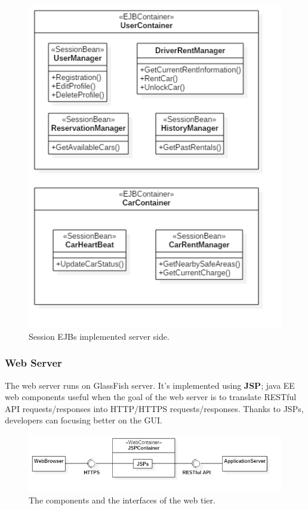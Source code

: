 \begin{figure}[H]
	\centering
	\includegraphics[width=\textwidth, keepaspectratio]{diagrams/SEJBs.png}
	\caption{Session EJBs implemented server side.}
	\label {fig:session-beans}
\end{figure}

\subsubsection{Web Server}

The web server runs on GlassFish server. It's implemented using \textbf{JSP}; java EE web components useful when the goal of the web server is to translate RESTful API requests/responses into  HTTP/HTTPS requests/responses. Thanks to JSPs, developers can focusing better on the GUI.

\begin{figure}[H]
	\centering
	\includegraphics[width=\textwidth, keepaspectratio]{diagrams/WebComponents.png}
	\caption{The components and the interfaces of the web tier.}
	\label {fig:web-components}
\end{figure}

